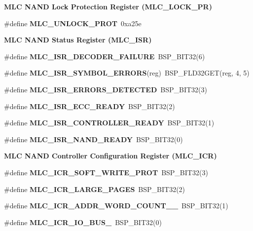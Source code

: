 \begin{Indent}\textbf{ M\+LC N\+A\+ND Lock Protection Register (M\+L\+C\+\_\+\+L\+O\+C\+K\+\_\+\+PR)}\par
\begin{DoxyCompactItemize}
\item 
\#define {\bfseries M\+L\+C\+\_\+\+U\+N\+L\+O\+C\+K\+\_\+\+P\+R\+OT}~0xa25e
\end{DoxyCompactItemize}
\end{Indent}
\begin{Indent}\textbf{ M\+LC N\+A\+ND Status Register (M\+L\+C\+\_\+\+I\+SR)}\par
\begin{DoxyCompactItemize}
\item 
\#define {\bfseries M\+L\+C\+\_\+\+I\+S\+R\+\_\+\+D\+E\+C\+O\+D\+E\+R\+\_\+\+F\+A\+I\+L\+U\+RE}~B\+S\+P\+\_\+\+B\+I\+T32(6)
\item 
\#define {\bfseries M\+L\+C\+\_\+\+I\+S\+R\+\_\+\+S\+Y\+M\+B\+O\+L\+\_\+\+E\+R\+R\+O\+RS}(reg)~B\+S\+P\+\_\+\+F\+L\+D32\+G\+ET(reg, 4, 5)
\item 
\#define {\bfseries M\+L\+C\+\_\+\+I\+S\+R\+\_\+\+E\+R\+R\+O\+R\+S\+\_\+\+D\+E\+T\+E\+C\+T\+ED}~B\+S\+P\+\_\+\+B\+I\+T32(3)
\item 
\#define {\bfseries M\+L\+C\+\_\+\+I\+S\+R\+\_\+\+E\+C\+C\+\_\+\+R\+E\+A\+DY}~B\+S\+P\+\_\+\+B\+I\+T32(2)
\item 
\#define {\bfseries M\+L\+C\+\_\+\+I\+S\+R\+\_\+\+C\+O\+N\+T\+R\+O\+L\+L\+E\+R\+\_\+\+R\+E\+A\+DY}~B\+S\+P\+\_\+\+B\+I\+T32(1)
\item 
\#define {\bfseries M\+L\+C\+\_\+\+I\+S\+R\+\_\+\+N\+A\+N\+D\+\_\+\+R\+E\+A\+DY}~B\+S\+P\+\_\+\+B\+I\+T32(0)
\end{DoxyCompactItemize}
\end{Indent}
\begin{Indent}\textbf{ M\+LC N\+A\+ND Controller Configuration Register (M\+L\+C\+\_\+\+I\+CR)}\par
\begin{DoxyCompactItemize}
\item 
\#define {\bfseries M\+L\+C\+\_\+\+I\+C\+R\+\_\+\+S\+O\+F\+T\+\_\+\+W\+R\+I\+T\+E\+\_\+\+P\+R\+OT}~B\+S\+P\+\_\+\+B\+I\+T32(3)
\item 
\#define {\bfseries M\+L\+C\+\_\+\+I\+C\+R\+\_\+\+L\+A\+R\+G\+E\+\_\+\+P\+A\+G\+ES}~B\+S\+P\+\_\+\+B\+I\+T32(2)
\item 
\#define {\bfseries M\+L\+C\+\_\+\+I\+C\+R\+\_\+\+A\+D\+D\+R\+\_\+\+W\+O\+R\+D\+\_\+\+C\+O\+U\+N\+T\+\_\+\_}~B\+S\+P\+\_\+\+B\+I\+T32(1)
\item 
\#define {\bfseries M\+L\+C\+\_\+\+I\+C\+R\+\_\+\+I\+O\+\_\+\+B\+U\+S\+\_}~B\+S\+P\+\_\+\+B\+I\+T32(0)
\end{DoxyCompactItemize}
\end{Indent}
